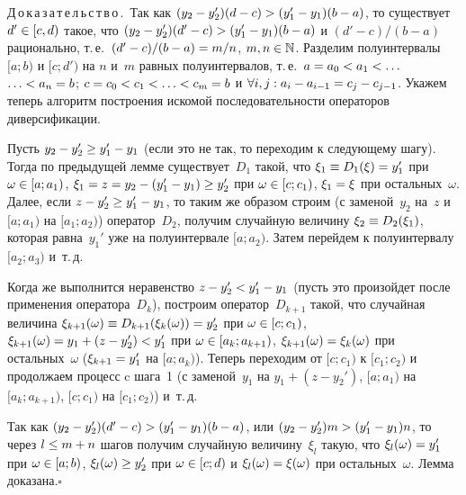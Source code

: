 \begin{multicols}{2}
\noindent
Д\,о\,к\,а\,з\,а\,т\,е\,л\,ь\,с\,т\,в\,о\,.\  Так как 
$(y_2 \hm- y_2')(d-c) \hm> (y_1' \hm- y_1)(b-a)$, то существует $d' \hm\in [c,d)$ такое, что 
$(y_2 \hm- y_2')(d'-c)\hm>(y_1' \hm- y_1)(b-a)$ и $(d'-c)/(b-a)$ рационально, т.\,е.\ 
$(d'-c)/(b-a) \hm=m/n$, $m,n \hm\in \mathbb{N}$.
Разделим полуинтервалы $[a;b)$ и $[c;d')$ на $n$ и~$m$ равных
полуинтервалов, т.\,е.\
$a\hm=a_0\hm<a_1<\ldots$\linebreak $\ldots<a_n\hm=b$; $c\hm=c_0\hm<c_1\hm<\ldots\hm<c_m\hm=b$ и 
$\forall i,j:
a_i\hm-a_{i-1}\hm=c_j\hm-c_{j-1}$.
Укажем теперь алгоритм построения искомой последовательности операторов диверсификации.

\smallskip

\noindent
{} Пусть $y_2-y_2' \hm\ge y_1'-y_1$ (если это не так, то
переходим к следующему шагу). Тогда по предыдущей лемме существует~$D_1$ 
такой, что $\xi_1 \hm\equiv D_1(\xi) \hm= y_1'$ при $\omega \hm\in [a;a_1)$, 
$\xi_1 \hm= z \hm= y_2\hm-(y_1'\hm-y_1) \hm\ge y_2'$ при $\omega \hm\in [c;c_1)$, 
$\xi_1 \hm= \xi$ при остальных~$\omega$. Далее, если
$z-y_2' \hm\ge y_1'\hm-y_1$, то таким же образом строим (с заменой~$y_2$
на~$z$ и $[a;a_1)$ на $[a_1;a_2)$) оператор~$D_2$, получим случайную величину
$\xi_2 \hm\equiv D_2(\xi_1)$, которая равна~$y_1'$ уже на полуинтервале
$[a;a_2)$. Затем перейдем к полуинтервалу $[a_2;a_3)$ и~т.\,д.

\smallskip

\noindent
{} Когда же выполнится неравенство $z-y_2' \hm< y_1'\hm-y_1$
(пусть это произойдет после применения оператора~$D_k$), построим
оператор~$D_{k+1}$ такой, что случайная величина $\xi_{k+1}(\omega)
\hm\equiv D_{k+1}(\xi_k(\omega)) \hm= y_2'$ при $\omega \hm\in [c;c_1)$,
$\xi_{k+1}(\omega) \hm= y_1\hm+(z\hm-y_2') \hm< y_1'$ при $\omega \hm\in [a_k;a_{k+1})$, 
$\xi_{k+1}(\omega) \hm= \xi_k(\omega)$ при остальных~$\omega$ 
($\xi_{k+1}\hm=y_1'$ на $[a;a_k)$). Теперь переходим от
$[c;c_1)$ к $[c_1;c_2)$ и продолжаем процесс c шага~1 (с заменой~$y_1$ 
на $y_1+(z-y_2')$, $[a;a_1)$ на $[a_k;a_{k+1})$, $[c;c_1)$ на
$[c_1;c_2)$) и~т.\,д.

Так как $(y_2 \hm- y_2')(d'\hm-c)>(y_1'\hm -
y_1)(b-a)$, или $(y_2 \hm- y_2')m>(y_1' \hm- y_1)n$, то через $l \hm\le m+n$
шагов получим случайную величину~$\xi_l$ такую, что
$\xi_l(\omega)\hm=y_1'$ при $\omega \hm\in [a;b)$, $\xi_l(\omega) \hm\ge
y_2'$ при $\omega \hm\in [c;d)$ и $\xi_l(\omega)\hm=\xi(\omega)$ при
остальных~$\omega$. Лемма доказана.\hfill$\square$

\smallskip


\end{multicols}
